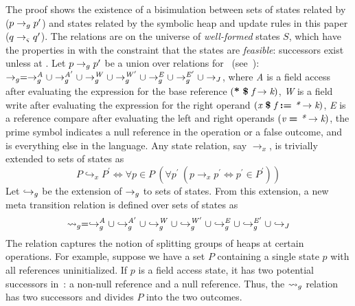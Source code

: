 The proof shows the existence of a
bisimulation between sets of states related by~\gsetxt{} ($p \rightarrow_{g}
p^\prime$) and states related by the symbolic heap and update rules in this paper ($q \rightarrow_{\varsigma}
q^\prime$). The relations are on the universe of \emph{well-formed}
states $S$, which have the properties in  with the
constraint that the states are \emph{feasible}: successors exist
unless at . Let $p \rightarrow_{g} p^\prime$ be a union over relations
for~\gsetxt{} (see~\cite{Hillery:2015}): $\rightarrow_{g} = \rightarrow_{g}^\mathit{A} \cup
\rightarrow_{g}^\mathit{A^\prime} \cup \rightarrow_{g}^\mathit{W} \cup
\rightarrow_{g}^\mathit{W^\prime} \cup \rightarrow_{g}^\mathit{E} \cup
\rightarrow_{g}^\mathit{E^\prime} \cup \rightarrow_{J}$, where \emph{A} is a field access
after evaluating the expression for the base reference $(
\textbf{*}\ \textbf{\$}\ \emph{f} \rightarrow \emph{k})$, \emph{W} is
a field write after evaluating the expression for the right operand
$\lp \cfgnt{x}\ \cfgt{\$}\ \cfgnt{f}\ \cfgt{:=}\ \cfgnt{*} \rightarrow
\cfgnt{k}\rp$, \emph{E} is a reference compare after evaluating the
left and right operands $\lp \cfgnt{v}\ \cfgt{=}\ \cfgnt{*}
\rightarrow \cfgnt{k}\rp$, the prime symbol indicates a null reference
in the operation or a false outcome, and \emph{\com} is everything
else in the language. Any state relation, say $\rightarrow_x$, is
trivially extended to sets of states as
$$
P \hookrightarrow_x P^\prime \Longleftrightarrow \forall p \in P\ (\forall p^\prime\ (p \rightarrow_x p^\prime \Leftrightarrow p^\prime \in P^\prime))
$$
Let $\hookrightarrow_{g}$ be the extension of $\rightarrow_{g}$ to sets of
states. From this extension, a new meta transition relation is defined
over sets of states as
$$
\leadsto_{g} = \hookrightarrow_{g}^\mathit{A}
\cup \hookrightarrow_{g}^\mathit{A^\prime} \cup \hookrightarrow_{g}^\mathit{W} \cup
\hookrightarrow_{g}^\mathit{W^\prime} \cup \hookrightarrow_{g}^\mathit{E} \cup \hookrightarrow_{g}^\mathit{E^\prime}
\cup \hookrightarrow_{J}
$$
The relation captures the notion of splitting groups of heaps at
certain operations. For example, suppose we have a set $P$ containing a single state $p$
with all references uninitialized. If $p$ is a field access state, it has two
potential successors in~\gsetxt{}: a non-null reference and a null reference. 
Thus, the $\leadsto_{g}$ relation has two successors and divides $P$ into the two outcomes.

